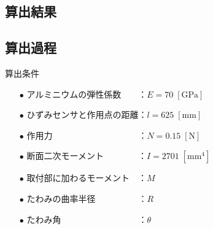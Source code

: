 \documentclass[twocolumn,a4j]{jsarticle}
\begin{document}
\subsection{算出結果}

\subsection{算出過程}
\begin{itembox}[l]{算出条件}
    \begin{itemize}
        \item [$\bullet$] アルミニウムの弾性係数　　：$E = 70 \;\left[\mathrm{GPa}\right]$
        \item [$\bullet$] ひずみセンサと作用点の距離：$l = 625 \;\left[\mathrm{mm}\right]$
        \item [$\bullet$] 作用力　　　　　　　　　　：$N = 0.15 \;\left[\mathrm{N}\right]$              
        \item [$\bullet$] 断面二次モーメント　　　　：$I = 2701 \;\left[\mathrm{mm^4}\right]$              
        \item [$\bullet$] 取付部に加わるモーメント　：$M$              
        \item [$\bullet$] たわみの曲率半径　　　　　：$R$              
        \item [$\bullet$] たわみ角　　　　　　　　　：$\theta$              
    \end{itemize}
\end{itembox}
\end{document}
